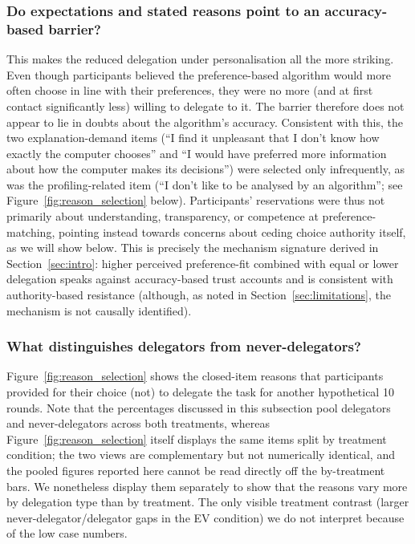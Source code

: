\documentclass[a4paper, 12pt, fleqn]{article}
\theoremstyle{hypstyle}
\begin{document}
\subsubsection*{Do expectations and stated reasons point to an accuracy-based barrier?}
This makes the reduced delegation under personalisation all the more striking. Even though participants believed the preference-based algorithm would more often choose in line with their preferences, they were no more (and at first contact significantly less) willing to delegate to it. The barrier therefore does not appear to lie in doubts about the algorithm's accuracy. Consistent with this, the two explanation-demand items (``I find it unpleasant that I don't know how exactly the computer chooses'' and ``I would have preferred more information about how the computer makes its decisions'') were selected only infrequently, as was the profiling-related item (``I don't like to be analysed by an algorithm''; see Figure~\ref{fig:reason_selection} below). Participants' reservations were thus not primarily about understanding, transparency, or competence at preference-matching, pointing instead towards concerns about ceding choice authority itself, as we will show below. This is precisely the mechanism signature derived in Section~\ref{sec:intro}: higher perceived preference-fit combined with equal or lower delegation speaks against accuracy-based trust accounts and is consistent with authority-based resistance (although, as noted in Section~\ref{sec:limitations}, the mechanism is not causally identified).

\subsubsection*{What distinguishes delegators from never-delegators?}

Figure~\ref{fig:reason_selection} shows the closed-item reasons that participants provided for their choice (not) to delegate the task for another hypothetical 10 rounds. 
Note that the percentages discussed in this subsection pool delegators and never-delegators across both treatments, whereas Figure~\ref{fig:reason_selection} itself displays the same items split by treatment condition; the two views are complementary but not numerically identical, and the pooled figures reported here cannot be read directly off the by-treatment bars. We nonetheless display them separately to show that the reasons vary more by delegation type than by treatment. The only visible treatment contrast (larger never-delegator/delegator gaps in the EV condition) we do not interpret because of the low case numbers. 
\end{document}
